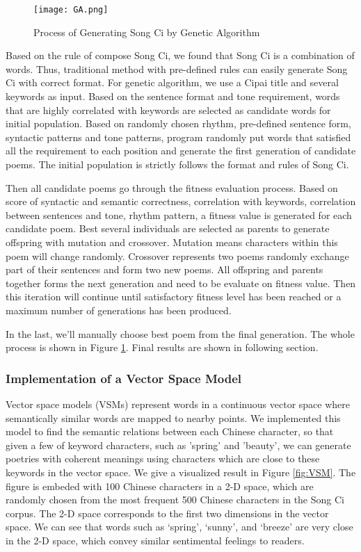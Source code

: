 \begin{figure}[htbp]
	\centering
	\texttt{[image: GA.png]}
	\caption{Process of Generating Song Ci by Genetic Algorithm}
	\label{fig:GA}
\end{figure}


Based on the rule of compose Song Ci, we found that Song Ci is a combination of words.
%
Thus, traditional method with pre-defined rules can easily generate Song Ci with correct format.
%
For genetic algorithm, we use a Cipai title and several keywords as input.
%
Based on the sentence format and tone requirement, words that are highly correlated with keywords are selected as candidate words for initial population.
%
Based on randomly chosen rhythm, pre-defined sentence form, syntactic patterns and tone patterns, program randomly put words that satisfied all the requirement to each position and generate the first generation of candidate poems.
%
The initial population is strictly follows the format and rules of Song Ci.


Then all candidate poems go through the fitness evaluation process.
%
Based on score of syntactic and semantic correctness, correlation with keywords, correlation between sentences and tone, rhythm pattern, a fitness value is generated for each candidate poem.
%
Best several individuals are selected as parents to generate offspring with mutation and crossover.
%
Mutation means characters within this poem will change randomly.
%
Crossover represents two poems randomly exchange part of their sentences and form two new poems.
%
All offspring and parents together forms the next generation and need to be evaluate on fitness value.
%
Then this iteration will continue until satisfactory fitness level has been reached or a maximum number of generations has been produced.


In the last, we'll manually choose best poem from the final generation.
%
The whole process is shown in Figure \ref{fig:GA}.
%
Final results are shown in following section.


\subsubsection{ Implementation of a Vector Space Model }
Vector space models (VSMs) represent words in a continuous vector space where semantically similar words are mapped to nearby points.
%
We implemented this model to find the semantic relations between each Chinese character, so that given a few of keyword characters, such as 'spring' and 'beauty', we can generate poetries with coherent meanings using characters which are close to these keywords in the vector space.
%
%
We give a visualized result in Figure \ref{fig:VSM}. The figure is embeded with 100 Chinese characters in a 2-D space, which are randomly chosen from the most frequent 500 Chinese characters in the Song Ci corpus. The 2-D space corresponds to the first two dimensions in the vector space. We can see that words such as `spring', `sunny', and `breeze' are very close in the 2-D space, which convey similar sentimental feelings to readers.

